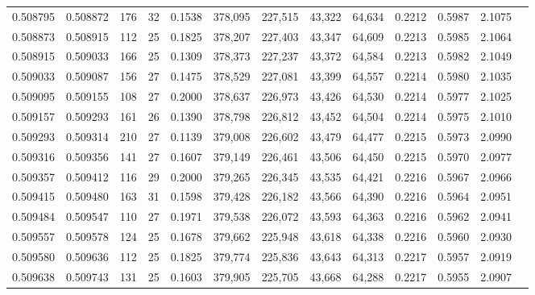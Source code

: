 \begin{tabular}{rrrrrrrrrrrrr}
0.508795 & 0.508872 & 176 &  32 &                                     0.1538 & 378,095 & 227,515 &  43,322 &  64,634 & 0.2212 & 0.5987 & 2.1075 \\
0.508873 & 0.508915 & 112 &  25 &                                     0.1825 & 378,207 & 227,403 &  43,347 &  64,609 & 0.2213 & 0.5985 & 2.1064 \\
0.508915 & 0.509033 & 166 &  25 &                                     0.1309 & 378,373 & 227,237 &  43,372 &  64,584 & 0.2213 & 0.5982 & 2.1049 \\
0.509033 & 0.509087 & 156 &  27 &                                     0.1475 & 378,529 & 227,081 &  43,399 &  64,557 & 0.2214 & 0.5980 & 2.1035 \\
0.509095 & 0.509155 & 108 &  27 &                                     0.2000 & 378,637 & 226,973 &  43,426 &  64,530 & 0.2214 & 0.5977 & 2.1025 \\
0.509157 & 0.509293 & 161 &  26 &                                     0.1390 & 378,798 & 226,812 &  43,452 &  64,504 & 0.2214 & 0.5975 & 2.1010 \\
0.509293 & 0.509314 & 210 &  27 &                                     0.1139 & 379,008 & 226,602 &  43,479 &  64,477 & 0.2215 & 0.5973 & 2.0990 \\
0.509316 & 0.509356 & 141 &  27 &                                     0.1607 & 379,149 & 226,461 &  43,506 &  64,450 & 0.2215 & 0.5970 & 2.0977 \\
0.509357 & 0.509412 & 116 &  29 &                                     0.2000 & 379,265 & 226,345 &  43,535 &  64,421 & 0.2216 & 0.5967 & 2.0966 \\
0.509415 & 0.509480 & 163 &  31 &                                     0.1598 & 379,428 & 226,182 &  43,566 &  64,390 & 0.2216 & 0.5964 & 2.0951 \\
0.509484 & 0.509547 & 110 &  27 &                                     0.1971 & 379,538 & 226,072 &  43,593 &  64,363 & 0.2216 & 0.5962 & 2.0941 \\
0.509557 & 0.509578 & 124 &  25 &                                     0.1678 & 379,662 & 225,948 &  43,618 &  64,338 & 0.2216 & 0.5960 & 2.0930 \\
0.509580 & 0.509636 & 112 &  25 &                                     0.1825 & 379,774 & 225,836 &  43,643 &  64,313 & 0.2217 & 0.5957 & 2.0919 \\
0.509638 & 0.509743 & 131 &  25 &                                     0.1603 & 379,905 & 225,705 &  43,668 &  64,288 & 0.2217 & 0.5955 & 2.0907 \\

\end{tabular}
